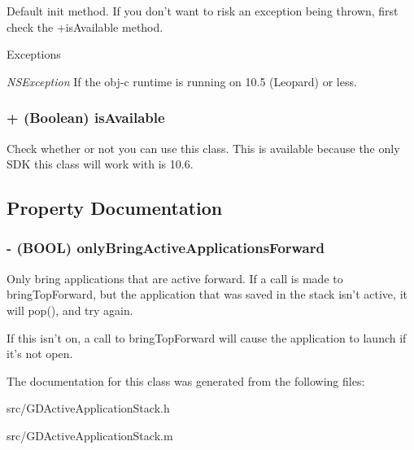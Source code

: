 Default init method. If you don't want to risk an exception being thrown, first check the +isAvailable method.


\begin{DoxyExceptions}{Exceptions}
\item[{\em NSException}]If the obj-\/c runtime is running on 10.5 (Leopard) or less. \end{DoxyExceptions}
\hypertarget{interface_g_d_active_application_stack_a10055d2ffec472e9413a8d84a7d8dd67}{
\subsubsection[{isAvailable}]{\setlength{\rightskip}{0pt plus 5cm}+ (Boolean) isAvailable }}
\label{interface_g_d_active_application_stack_a10055d2ffec472e9413a8d84a7d8dd67}


Check whether or not you can use this class. This is available because the only SDK this class will work with is 10.6. 

\subsection{Property Documentation}
\hypertarget{interface_g_d_active_application_stack_a5714844d3e17a156cca14b1f383b3dbe}{
\subsubsection[{onlyBringActiveApplicationsForward}]{\setlength{\rightskip}{0pt plus 5cm}-\/ (BOOL) onlyBringActiveApplicationsForward}}
\label{interface_g_d_active_application_stack_a5714844d3e17a156cca14b1f383b3dbe}


Only bring applications that are active forward. If a call is made to bringTopForward, but the application that was saved in the stack isn't active, it will pop(), and try again.

If this isn't on, a call to bringTopForward will cause the application to launch if it's not open. 

The documentation for this class was generated from the following files:\begin{DoxyCompactItemize}
\item 
src/GDActiveApplicationStack.h\item 
src/GDActiveApplicationStack.m\end{DoxyCompactItemize}
